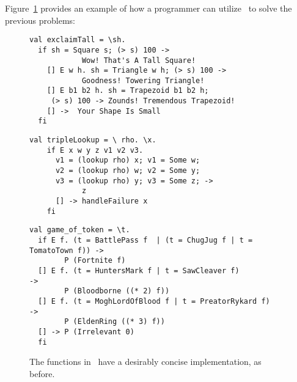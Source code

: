\documentclass[manuscript,screen,review, 12pt, nonacm]{acmart}
\begin{document}
    Figure~\ref{fig:vminusfuncs} provides an example of how a programmer can
    utilize \VMinus\ to solve the previous problems: 
    
    
    \begin{figure}[ht] 
      \begin{minipage}[h]{0.54\linewidth}
        \vmlst 
        \begin{lstlisting}[numbers=none, basicstyle=\tiny, xleftmargin=.2em,
          showstringspaces=false,
          frame=single]
val exclaimTall = \sh.
  if sh = Square s; (> s) 100 -> 
            Wow! That's A Tall Square!  
    [] E w h. sh = Triangle w h; (> s) 100 ->
            Goodness! Towering Triangle!
    [] E b1 b2 h. sh = Trapezoid b1 b2 h; 
     (> s) 100 -> Zounds! Tremendous Trapezoid!
    [] ->  Your Shape Is Small
  fi 
  \end{lstlisting}
          \label{fig:vmexclaimtall} 
      \end{minipage}%
      \begin{minipage}[h]{0.5\linewidth}
        \vmlst 
        \begin{lstlisting}[numbers=none, basicstyle=\tiny, xleftmargin=2em,
                      frame=single]
  val tripleLookup = \ rho. \x.
    if E x w y z v1 v2 v3. 
      v1 = (lookup rho) x; v1 = Some w; 
      v2 = (lookup rho) w; v2 = Some y; 
      v3 = (lookup rho) y; v3 = Some z; -> 
            z 
      [] -> handleFailure x
    fi 
   \end{lstlisting}
            \label{fig:vmtriplelookup} 
        \vspace{4ex}
      \end{minipage} 
      \begin{minipage}[h]{\linewidth}
        \vmlst 
        \begin{lstlisting}[numbers=none, basicstyle=\tiny, xleftmargin=9em,
          showstringspaces=false,
          frame=single]
val game_of_token = \t. 
  if E f. (t = BattlePass f  | (t = ChugJug f | t = TomatoTown f)) -> 
        P (Fortnite f)
  [] E f. (t = HuntersMark f | t = SawCleaver f)                   -> 
        P (Bloodborne ((* 2) f))
  [] E f. (t = MoghLordOfBlood f | t = PreatorRykard f)            -> 
        P (EldenRing ((* 3) f))
  [] -> P (Irrelevant 0)
  fi 
\end{lstlisting}
          \label{fig:vmgot}
      \vspace{4ex}
      \end{minipage}%
      \caption{The functions in \VMinus\ have a desirably concise
      implementation, as before.}
  \label{fig:vminusfuncs}
    \end{figure}   
\end{document}
